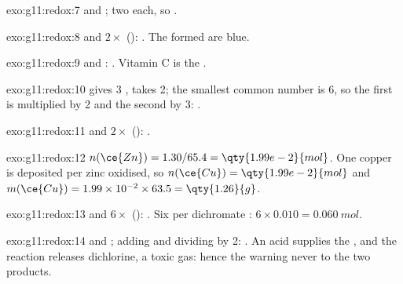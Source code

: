 \begin{solution}{exo:g11:redox:7}
 and ; two
 each, so .
\end{solution}

\begin{solution}{exo:g11:redox:8}
 and $2\times$ ():
. The   formed are blue.
\end{solution}

\begin{solution}{exo:g11:redox:9}
 and :
. Vitamin C is the .
\end{solution}

\begin{solution}{exo:g11:redox:10}
 gives 3 , 
takes 2; the smallest common number is 6, so the first is multiplied by
2 and the second by 3: .
\end{solution}

\begin{solution}{exo:g11:redox:11}
 and $2\times$ ():
.
\end{solution}

\begin{solution}{exo:g11:redox:12}
$n(\ce{Zn}) = 1.30/65.4 = \qty{1.99e-2}{mol}$. One copper  is
deposited per zinc  oxidised, so $n(\ce{Cu}) = \qty{1.99e-2}{mol}$
and $m(\ce{Cu}) = 1.99\times 10^{-2} \times 63.5 = \qty{1.26}{g}$.
\end{solution}

\begin{solution}{exo:g11:redox:13}
 and
$6\times$ ():
.
Six  per dichromate : $6 \times 0.010 = \qty{0.060}{mol}$.
\end{solution}

\begin{solution}{exo:g11:redox:14}
 and ; adding
and dividing by 2: . An acid supplies
the  , and the reaction releases dichlorine, a toxic gas:
hence the warning never to  the two products.
\end{solution}

